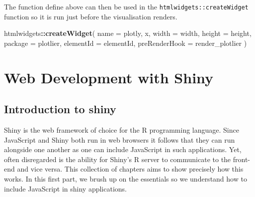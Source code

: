\documentclass[
]{krantz}
\makeatletter
\newenvironment{Shaded}{\begin{snugshade}}{\end{snugshade}}
\newcommand{\ControlFlowTok}[1]{\textcolor[rgb]{0.27,0.27,0.27}{\textbf{#1}}}
\newcommand{\DataTypeTok}[1]{\textcolor[rgb]{0.27,0.27,0.27}{#1}}
\newcommand{\KeywordTok}[1]{\textcolor[rgb]{0.27,0.27,0.27}{\textbf{#1}}}
\newcommand{\NormalTok}[1]{#1}
\newcommand{\OperatorTok}[1]{\textcolor[rgb]{0.43,0.43,0.43}{\textbf{#1}}}
\newcommand{\OtherTok}[1]{\textcolor[rgb]{0.37,0.37,0.37}{#1}}
\newcommand{\StringTok}[1]{\textcolor[rgb]{0.5,0.5,0.5}{#1}}
\newenvironment{kframe}{%
\medskip{}
\setlength{\fboxsep}{.8em}
 \def\at@end@of@kframe{}%
 \ifinner\ifhmode%
  \def\at@end@of@kframe{\end{minipage}}%
  \begin{minipage}{\columnwidth}%
 \fi\fi%
 \def\FrameCommand##1{\hskip\@totalleftmargin \hskip-\fboxsep
 \colorbox{shadecolor}{##1}\hskip-\fboxsep
     \hskip-\linewidth \hskip-\@totalleftmargin \hskip\columnwidth}%
 \MakeFramed {\advance\hsize-\width
   \@totalleftmargin\z@ \linewidth\hsize
   \@setminipage}}%
 {\par\unskip\endMakeFramed%
 \at@end@of@kframe}
\renewenvironment{Shaded}{\begin{kframe}}{\end{kframe}}
\makeatother
\begin{document}
\begin{Shaded}
\end{Shaded}

The function define above can then be used in the \texttt{htmlwidgets::createWidget} function so it is run just before the visualisation renders.

\begin{Shaded}
\begin{Highlighting}[]
\NormalTok{htmlwidgets}\OperatorTok{::}\KeywordTok{createWidget}\NormalTok{(}
  \DataTypeTok{name =} \StringTok{\textquotesingle{}plotly\textquotesingle{}}\NormalTok{,}
\NormalTok{  x,}
  \DataTypeTok{width =}\NormalTok{ width,}
  \DataTypeTok{height =}\NormalTok{ height,}
  \DataTypeTok{package =} \StringTok{\textquotesingle{}plotlier\textquotesingle{}}\NormalTok{,}
  \DataTypeTok{elementId =}\NormalTok{ elementId,}
  \DataTypeTok{preRenderHook =}\NormalTok{ render\_plotlier}
\NormalTok{)}
\end{Highlighting}
\end{Shaded}

\hypertarget{part-web-development-with-shiny}{%
\part{Web Development with Shiny}\label{part-web-development-with-shiny}}

\hypertarget{introduction-to-shiny}{%
\chapter{Introduction to shiny}\label{introduction-to-shiny}}

Shiny is the web framework of choice for the R programming language. Since JavaScript and Shiny both run in web browsers it follows that they can run alongside one another as one can include JavaScript in such applications. Yet, often disregarded is the ability for Shiny's R server to communicate to the front-end and vice versa. This collection of chapters aims to show precisely how this works. In this first part, we brush up on the essentials so we understand how to include JavaScript in shiny applications.
\end{document}

